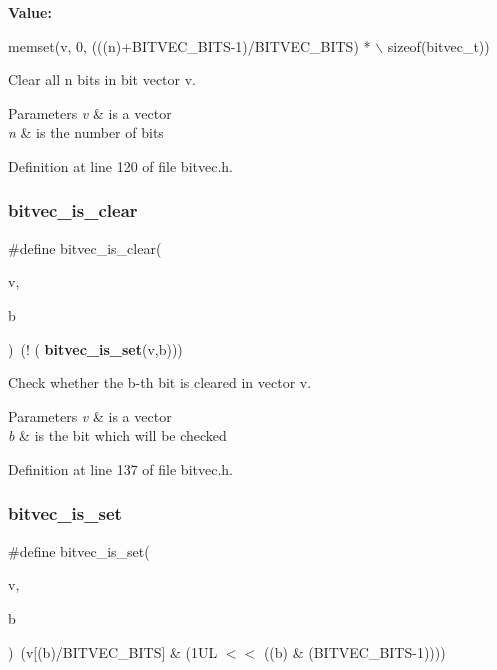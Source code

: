 {\bfseries Value\+:}
\begin{DoxyCode}
memset(v, 0, (((n)+BITVEC\_BITS-1)/BITVEC\_BITS) * \(\backslash\)
                                       \textcolor{keyword}{sizeof}(bitvec\_t))
\end{DoxyCode}


Clear all n bits in bit vector v. 


\begin{DoxyParams}{Parameters}
{\em v} & is a vector \\
\hline
{\em n} & is the number of bits \\
\hline
\end{DoxyParams}


Definition at line 120 of file bitvec.\+h.

\mbox{\label{bitvec_8h_a8154409a6e05e7c1ed7f21eff5ed06d4}} 
\subsubsection{bitvec\+\_\+is\+\_\+clear}
{\footnotesize\ttfamily \#define bitvec\+\_\+is\+\_\+clear(\begin{DoxyParamCaption}\item[{}]{v,  }\item[{}]{b }\end{DoxyParamCaption})~(! (\textbf{ bitvec\+\_\+is\+\_\+set}(v,b)))}



Check whether the b-\/th bit is cleared in vector v. 


\begin{DoxyParams}{Parameters}
{\em v} & is a vector \\
\hline
{\em b} & is the bit which will be checked \\
\hline
\end{DoxyParams}


Definition at line 137 of file bitvec.\+h.

\mbox{\label{bitvec_8h_ae323f80288b2ff946d6d8b0e38f791c9}} 
\subsubsection{bitvec\+\_\+is\+\_\+set}
{\footnotesize\ttfamily \#define bitvec\+\_\+is\+\_\+set(\begin{DoxyParamCaption}\item[{}]{v,  }\item[{}]{b }\end{DoxyParamCaption})~(v[(b)/B\+I\+T\+V\+E\+C\+\_\+\+B\+I\+TS] \& (1\+U\+L $<$$<$ ((b) \& (\+B\+I\+T\+V\+E\+C\+\_\+\+B\+I\+T\+S-\/1))))}



